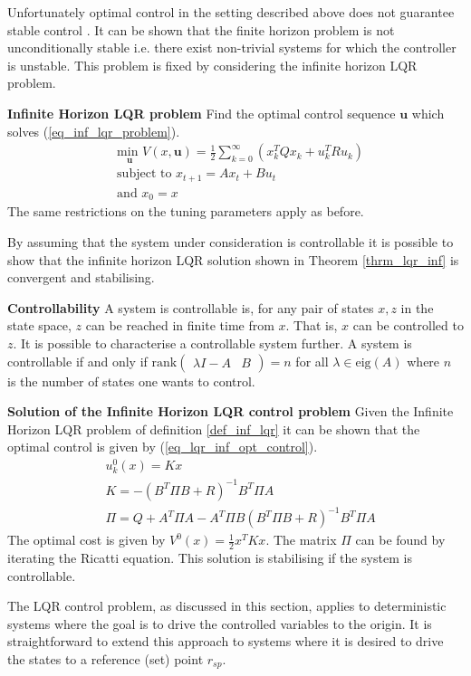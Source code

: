 \documentclass[../masters.tex]{subfiles}
\begin{document}
Unfortunately optimal control in the setting described above does not guarantee stable control \cite{raw}. It can be shown that the finite horizon problem is not unconditionally stable i.e. there exist non-trivial systems for which the controller is unstable. This problem is fixed by considering the infinite horizon LQR problem. 
\begin{defn}
\textbf{Infinite Horizon LQR problem} Find the optimal control sequence $\mathbf{u}$ which solves (\ref{eq_inf_lqr_problem}).
\begin{equation}
\begin{aligned}
&\underset{\mathbf{u}}{\text{min }} V(x, \mathbf{u}) = \frac{1}{2}\sum_{k=0}^{\infty} \left( x_k^TQx_k + u_k^TRu_k \right) \\
&\text{subject to } x_{t+1} = Ax_t+Bu_t \\
&\text{and } x_0 = x
\end{aligned}
\label{eq_inf_lqr_problem}
\end{equation}
The same restrictions on the tuning parameters apply as before.
\label{def_inf_lqr}
\end{defn}
By assuming that the system under consideration is controllable it is possible to show that the infinite horizon LQR solution shown in Theorem \ref{thrm_lqr_inf} is convergent and stabilising.
\begin{defn}
\textbf{Controllability} A system is controllable is, for any pair of states $x,z$ in the state space, $z$ can be reached in finite time from $x$. That is, $x$ can be controlled to $z$. It is possible to characterise a controllable system further. A system is controllable if and only if $\text{rank}\begin{pmatrix}
\lambda I- A & B
\end{pmatrix} = n$ for all $\lambda \in \text{eig}(A)$ where $n$ is the number of states one wants to control. 
\end{defn}
\begin{thrm}
\textbf{Solution of the Infinite Horizon LQR control problem} Given the Infinite Horizon LQR problem of definition \ref{def_inf_lqr} it can be shown that the optimal control is given by (\ref{eq_lqr_inf_opt_control}).
\begin{equation}
\begin{aligned}
&u^0_{k}(x) = Kx \\
&K = -(B^T\Pi B+R)^{-1}B^T\Pi A \\
&\Pi = Q + A^T\Pi A-A^T\Pi B(B^T\Pi B+R)^{-1}B^T\Pi A  
\end{aligned}
\label{eq_lqr_inf_opt_control}
\end{equation}
The optimal cost is given by $V^0(x) = \frac{1}{2}x^TKx$. The matrix $\Pi$ can be found by iterating the Ricatti equation. This solution is stabilising if the system is controllable.
\label{thrm_lqr_inf}
\end{thrm}
The LQR control problem, as discussed in this section, applies to deterministic systems where the goal is to drive the controlled variables to the origin. It is straightforward to extend this approach to systems where it is desired to drive the states to a reference (set) point $r_{sp}$.
\end{document}
